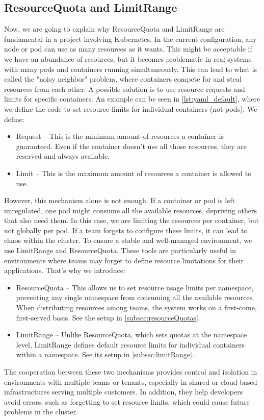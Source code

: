 \subsection{ResourceQuota and LimitRange}
\label{subsec:resource quotas}
Now, we are going to explain why ResourceQuota \cite{kubernetes2025resourcequotas} and LimitRange are fundamental in a project involving Kubernetes.
In the current configuration, any node or pod can use as many resources as it wants. This might be acceptable if we have an abundance of resources, but it becomes problematic in real systems with many pods and containers running simultaneously. This can lead to what is called the "noisy neighbor" problem, where containers compete for and steal resources from each other. A possible solution is to use resource requests and limits for specific containers. An example can be seen in \autoref{lst:yaml_default}, where we define the code to set resource limits for individual containers (not pods). We define:
\begin{itemize}
    \item Request – This is the minimum amount of resources a container is guaranteed. Even if the container doesn't use all those resources, they are reserved and always available.
    \item Limit – This is the maximum amount of resources a container is allowed to use.
\end{itemize}
However, this mechanism alone is not enough. If a container or pod is left unregulated, one pod might consume all the available resources, depriving others that also need them. In this case, we are limiting the resources per container, but not globally per pod. If a team forgets to configure these limits, it can lead to chaos within the cluster.
To ensure a stable and well-managed environment, we use LimitRange and ResourceQuota. These tools are particularly useful in environments where teams may forget to define resource limitations for their applications. That’s why we introduce:
\begin{itemize}
    \item ResourceQuota – This allows us to set resource usage limits per namespace, preventing any single namespace from consuming all the available resources. When distributing resources among teams, the system works on a first-come, first-served basis. See the setup in \autoref{subsec:resourceQuotas}.
    \item LimitRange – Unlike ResourceQuota, which sets quotas at the namespace level, LimitRange defines default resource limits for individual containers within a namespace. See its setup in \autoref{subsec:limitRange}.
\end{itemize}
The cooperation between these two mechanisms provides control and isolation in environments with multiple teams or tenants, especially in shared or cloud-based infrastructures serving multiple customers. In addition, they help developers avoid errors, such as forgetting to set resource limits, which could cause future problems in the cluster.

